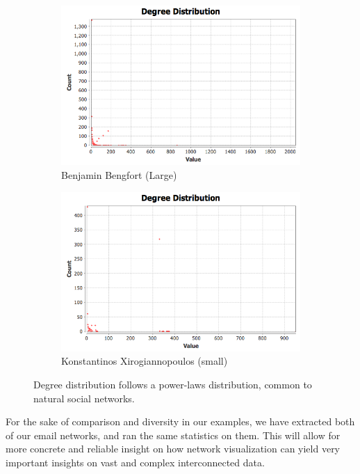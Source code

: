 \documentclass[11pt,letterpaper]{article}
\begin{document}
\begin{figure}[h]
	\centering
	\begin{subfigure}{0.49\textwidth}
		\centering
		\includegraphics[width=\textwidth]{figures/benjamin_degree.png}
		\caption{\textsf{Benjamin Bengfort (Large)}}
        \label{fig:benjamin_degree}
	\end{subfigure} \hfill
	\begin{subfigure}{0.49\textwidth}
		\centering
		\includegraphics[width=\textwidth]{figures/kostas_degree.png}
		\caption{\textsf{Konstantinos Xirogiannopoulos (small)}}
        \label{fig:kostas_degree}
	\end{subfigure}
    \caption{\textsf{Degree distribution follows a power-laws distribution, common to natural social networks.}}
    \label{fig:degree}
\end{figure}

For the sake of comparison and diversity in our examples, we have extracted both of our email networks, and ran the same statistics on them. This will allow for more concrete and reliable insight on how network visualization can yield very important insights on vast and complex interconnected data.
\end{document}
